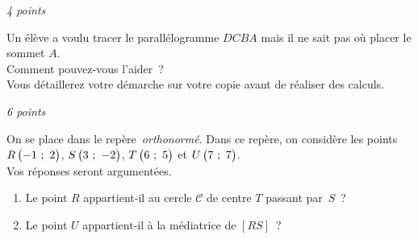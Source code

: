\begin{minipage}{0.45\textwidth}
\thispagestyle{sujet2}

\vspace*{1em}

\exercice\hfill \emph{4 points}

Un élève a voulu tracer le parallélogramme $DCBA$ mais il ne sait pas où placer le sommet $A$.\\ Comment pouvez-vous l'aider~?\\ Vous détaillerez votre démarche sur votre copie avant de réaliser des calculs.

\begin{center}


\end{center}


\vspace*{2em}

\exercice\hfill \emph{6 points}

On se place dans le repère~\emph{orthonormé}. Dans ce repère, on considère les points $R\begin{pmatrix}-1~;~2\end{pmatrix}$, $S\begin{pmatrix}3~;~-2\end{pmatrix}$, $T\begin{pmatrix}6~;~5\end{pmatrix}$ et $U\begin{pmatrix}7~;~7\end{pmatrix}$.\\Vos réponses seront argumentées.

	\begin{enumerate}
		\item Le point $R$ appartient-il au cercle $\mathscr{C}$ de centre $T$ passant par~$S$~?
		\item Le point $U$ appartient-il à la médiatrice de $\left[RS\right]$~?
	\end{enumerate}



\vspace{-2em}


\end{minipage}
\newpage

